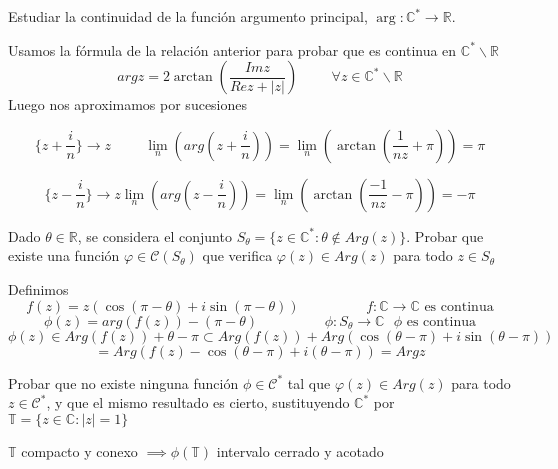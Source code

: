 \begin{ejer}
	Estudiar la continuidad de la función argumento principal, $\arg : \mathbb{C}^{\ast} \rightarrow \mathbb{R}$.
\end{ejer}

\begin{sol}


Usamos la fórmula de la relación anterior para probar que es continua en $\mathbb{C}^{\ast} \backslash \mathbb{R}$
$$  
arg z = 2\arctan (\frac{Imz}{Rez + |z|}) \hspace{1cm} \forall z\in\mathbb{C}^{\ast}\backslash\mathbb{R}
$$
Luego nos aproximamos por sucesiones

$$  
\{ z+\frac{i}{n} \} \rightarrow z \hspace{1cm}
\lim_n(arg(z+\frac{i}{n})) = \lim_n( \arctan(\frac{1}{nz}+\pi) ) = \pi
$$

$$
\{ z-\frac{i}{n} \} \rightarrow z
\lim_n(arg(z-\frac{i}{n})) = \lim_n( \arctan(\frac{-1}{nz}-\pi) ) = -\pi
$$
\end{sol}

\begin{ejer}
	Dado $\theta\in\mathbb{R}$, se considera el conjunto $S_{\theta} = \{ z\in\mathbb{C}^{\ast} : \theta\not\in Arg(z) \}$. 
	Probar que existe una función $\varphi\in\mathcal{C}(S_{\theta})$ que verifica $\varphi(z)\in Arg(z)$ para todo $z\in S_{\theta}$
\end{ejer}

\begin{sol}
Definimos
$$
f(z) = z( \cos(\pi-\theta) + i\sin(\pi-\theta) ) \hspace{2cm} f:\mathbb{C}\rightarrow \mathbb{C} \text{ es continua}
$$
$$
\phi(z) = arg(f(z)) - (\pi-\theta) \hspace{2cm} \phi: S_{\theta} \rightarrow \mathbb{C} \text{ $\phi$ es continua}
$$
$$ 
\phi(z) \in Arg (f(z)) + \theta-\pi \subset Arg (f(z)) + Arg( \cos(\theta-\pi)+i\sin(\theta-\pi) ) 
$$
$$= Arg ( f(z)-\cos(\theta-\pi)+i(\theta-\pi) ) = Argz
$$
\end{sol}

\begin{ejer}
	Probar que no existe ninguna función $\phi\in\mathcal{C}^{\ast}$ tal que $\varphi(z)\in Arg(z)$ para todo $z\in\mathcal{C}^{\ast}$, y que el mismo resultado es cierto, sustituyendo $\mathbb{C}^{\ast}$ por $\mathbb{T}=\{ z\in\mathbb{C} : |z|=1 \}$
\end{ejer}

$\mathbb{T}$ compacto y conexo $\implies \phi(\mathbb{T})$ intervalo cerrado y acotado

